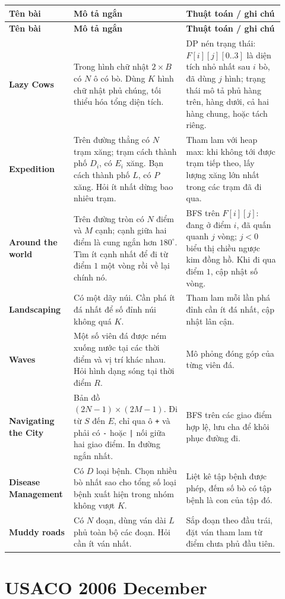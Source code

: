 \documentclass[11pt]{article}
\newenvironment{solutiontable}{%
  \small
  \setlength{\tabcolsep}{4pt}
  \renewcommand{\arraystretch}{1.14}
  \begin{longtable}{L{0.19\linewidth}L{0.39\linewidth}L{0.34\linewidth}}
  \toprule
  \textbf{Tên bài} & \textbf{Mô tả ngắn} & \textbf{Thuật toán / ghi chú}\\
  \midrule
  \endfirsthead
  \toprule
  \textbf{Tên bài} & \textbf{Mô tả ngắn} & \textbf{Thuật toán / ghi chú}\\
  \midrule
  \endhead
}{%
  \bottomrule
  \end{longtable}
  \normalsize
}
\newcommand{\problemrow}[3]{\textbf{#1} & #2 & #3\\\midrule}
\begin{document}
\begin{solutiontable}
\problemrow{Lazy Cows}{Trong hình chữ nhật \(2\times B\) có \(N\) ô có bò. Dùng \(K\) hình chữ nhật phủ chúng, tối thiểu hóa tổng diện tích.}{DP nén trạng thái: \(F[i][j][0..3]\) là diện tích nhỏ nhất sau \(i\) bò, đã dùng \(j\) hình; trạng thái mô tả phủ hàng trên, hàng dưới, cả hai hàng chung, hoặc tách riêng.}
\problemrow{Expedition}{Trên đường thẳng có \(N\) trạm xăng; trạm cách thành phố \(D_i\), có \(E_i\) xăng. Bạn cách thành phố \(L\), có \(P\) xăng. Hỏi ít nhất dừng bao nhiêu trạm.}{Tham lam với heap max: khi không tới được trạm tiếp theo, lấy lượng xăng lớn nhất trong các trạm đã đi qua.}
\problemrow{Around the world}{Trên đường tròn có \(N\) điểm và \(M\) cạnh; cạnh giữa hai điểm là cung ngắn hơn \(180^\circ\). Tìm ít cạnh nhất để đi từ điểm \(1\) một vòng rồi về lại chính nó.}{BFS trên \(F[i][j]\): đang ở điểm \(i\), đã quấn quanh \(j\) vòng; \(j<0\) biểu thị chiều ngược kim đồng hồ. Khi đi qua điểm \(1\), cập nhật số vòng.}
\problemrow{Landscaping}{Có một dãy núi. Cần phá ít đá nhất để số đỉnh núi không quá \(K\).}{Tham lam mỗi lần phá đỉnh cần ít đá nhất, cập nhật lân cận.}
\problemrow{Waves}{Một số viên đá được ném xuống nước tại các thời điểm và vị trí khác nhau. Hỏi hình dạng sóng tại thời điểm \(R\).}{Mô phỏng đóng góp của từng viên đá.}
\problemrow{Navigating the City}{Bản đồ \((2N-1)\times(2M-1)\). Đi từ \(S\) đến \(E\), chỉ qua ô \texttt{+} và phải có \texttt{-} hoặc \texttt{|} nối giữa hai giao điểm. In đường ngắn nhất.}{BFS trên các giao điểm hợp lệ, lưu cha để khôi phục đường đi.}
\problemrow{Disease Management}{Có \(D\) loại bệnh. Chọn nhiều bò nhất sao cho tổng số loại bệnh xuất hiện trong nhóm không vượt \(K\).}{Liệt kê tập bệnh được phép, đếm số bò có tập bệnh là con của tập đó.}
\problemrow{Muddy roads}{Có \(N\) đoạn, dùng ván dài \(L\) phủ toàn bộ các đoạn. Hỏi cần ít ván nhất.}{Sắp đoạn theo đầu trái, đặt ván tham lam từ điểm chưa phủ đầu tiên.}
\end{solutiontable}

\section{USACO 2006 December}
\end{document}
